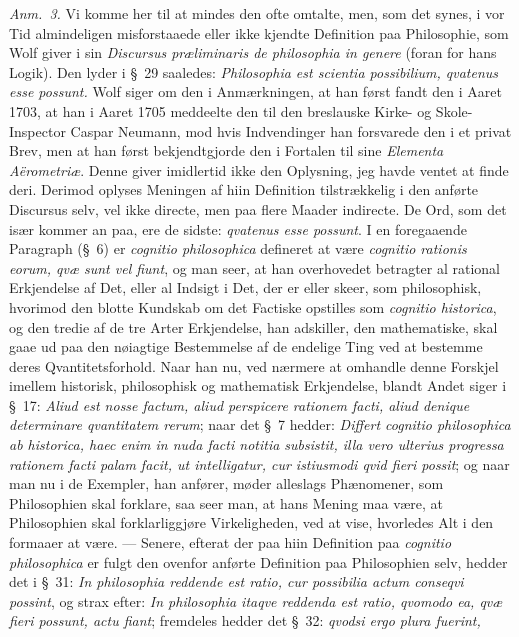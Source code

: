 \documentclass[12pt,a4paper]{book}
\begin{document}
{\small\emph{Anm.~3.} Vi komme her til at mindes den ofte omtalte, men, som det
synes, i vor Tid almindeligen misforstaaede eller ikke kjendte Definition paa
Philosophie, som Wolf giver i sin \textit{Discursus præliminaris de philosophia in
genere} (foran for hans Logik). Den lyder i \S~29 saaledes: \textit{Philosophia est
scientia possibilium, qvatenus esse possunt.} Wolf siger om den i Anmærkningen, at
han først fandt den i Aaret 1703, at han i Aaret 1705 meddeelte den til den
breslauske Kirke- og Skole-Inspector Caspar Neumann, mod hvis Indvendinger han
forsvarede den i et privat Brev, men at han først bekjendtgjorde den i Fortalen til
sine \textit{Elementa Aërometriæ}. Denne giver imidlertid ikke den Oplysning, jeg
havde ventet at finde deri. Derimod oplyses Meningen af hiin Definition
tilstrækkelig i den anførte Discursus selv, vel ikke directe, men paa flere Maader
indirecte. De Ord, som det især kommer an paa, ere de sidste: \textit{qvatenus esse
possunt}. I en foregaaende Paragraph (\S~6) er \textit{cognitio philosophica}
defineret at være \textit{cognitio rationis eorum, qvæ sunt vel fiunt}, og man seer,
at han overhovedet betragter al rational Erkjendelse af Det, eller al Indsigt i Det,
der er eller skeer, som philosophisk, hvorimod den blotte Kundskab om det Factiske
opstilles som \textit{cognitio historica}, og den tredie af de tre Arter
Erkjendelse, han adskiller, den mathematiske, skal gaae ud paa den nøiagtige
Bestemmelse af de endelige Ting ved at bestemme deres Qvantitetsforhold. Naar han
nu, ved nærmere at omhandle denne Forskjel imellem historisk, philosophisk og
mathematisk Erkjendelse, blandt Andet siger i \S~17: \textit{Aliud est nosse factum,
aliud perspicere rationem facti, aliud denique determinare qvantitatem rerum}; naar
det \S~7 hedder: \textit{Differt cognitio philosophica ab historica, haec enim in
nuda facti notitia subsistit, illa vero ulterius progressa rationem facti palam
facit, ut intelligatur, cur istiusmodi qvid fieri possit}; og naar man nu i de
Exempler, han anfører, møder alleslags Phænomener, som Philosophien skal forklare,
saa seer man, at hans Mening maa være, at Philosophien skal forklarliggjøre
Virkeligheden, ved at vise, hvorledes Alt i den formaaer at være. --- Senere,
efterat der paa hiin Definition paa \textit{cognitio philosophica} er fulgt den
ovenfor anførte Definition paa Philosophien selv, hedder det i \S~31: \textit{In
philosophia reddende est ratio, cur possibilia actum conseqvi possint}, og strax
efter: \textit{In philosophia itaqve reddenda est ratio, qvomodo ea, qvæ fieri
possunt, actu fiant}; fremdeles hedder det \S~32: \textit{qvodsi ergo plura fuerint,
}}
\end{document}

